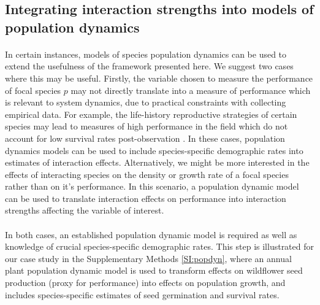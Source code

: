 \documentclass[a4,12pt]{article}
\begin{document}
\begin{refsection}
    \subsection{Integrating interaction strengths into models of population dynamics}

        \paragraph{}
        In certain instances, models of species population dynamics can be used to extend the usefulness of the framework presented here. We suggest two cases where this may be useful. Firstly, the variable chosen to measure the performance of focal species $p$ may not directly translate into a measure of performance which is relevant to system dynamics, due to practical constraints with collecting empirical data. For example, the life-history reproductive strategies of certain species may lead to measures of high performance in the field which do not account for low survival rates post-observation \parencite{Broekman2020}. In these cases, population dynamics models can be used to include species-specific demographic rates into estimates of interaction effects. Alternatively, we might be more interested in the effects of interacting species on the density or growth rate of a focal species rather than on it's performance. In this scenario, a population dynamic model can be used to translate interaction effects on performance into interaction strengths affecting the variable of interest. 

        \paragraph{}
        In both cases, an established population dynamic model is required as well as knowledge of crucial species-specific demographic rates. This step is illustrated for our case study in the Supplementary Methods \ref{SI:popdyn}, where an annual plant population dynamic model is used to transform effects on wildflower seed production (proxy for performance) into effects on population growth, and includes species-specific estimates of seed germination and survival rates. 




\end{refsection}
\end{document}
